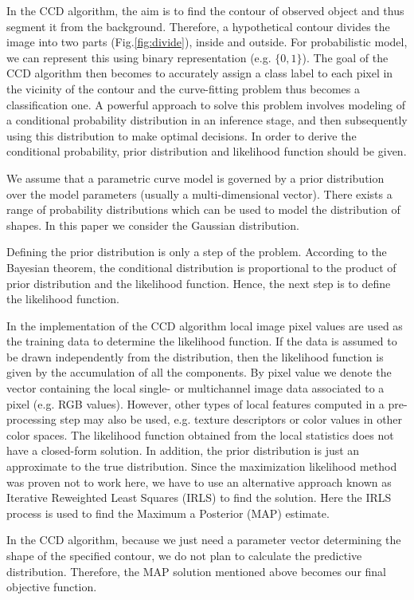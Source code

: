 \documentclass[conference]{IEEEtran}
\begin{document}
In the CCD algorithm, the aim is to find the contour of observed object
and thus segment it from the background. Therefore, a hypothetical 
contour divides the image into two parts (Fig.\ref{fig:divide}), inside
and outside. For probabilistic model, we can represent this using
binary representation (e.g. $\{0, 1\}$). The goal of the CCD algorithm
then becomes to accurately assign a class label to each pixel in the vicinity of the
contour and the curve-fitting problem thus becomes a classification
one. A powerful approach to solve this problem involves modeling of a
conditional probability distribution in an inference stage, and then
subsequently using this distribution to make optimal decisions. In
order to derive the conditional probability, prior distribution and
likelihood function should be given.

We assume that a parametric curve model is governed by a prior distribution
over the model parameters (usually a multi-dimensional vector). There
exists a range of probability distributions which can be used to model
the distribution of shapes. In this paper we consider the Gaussian distribution.

Defining the prior distribution is only a step of the problem.
According to the Bayesian theorem, the conditional distribution
is proportional to the product of prior distribution and the likelihood
function. Hence, the next step is to define the likelihood function.

In the implementation of the CCD algorithm local image pixel values are used
as the training data to determine the likelihood function. If the data is 
assumed to be drawn independently from the distribution, then the likelihood 
function is given by the accumulation of all the components.
By pixel value we denote the vector containing the local single- or multichannel
image data associated to a pixel (e.g. RGB values). 
However, other types of local features computed in a pre-processing
step may also be used, e.g. texture descriptors or color values in
other color spaces. The likelihood function obtained from the local statistics does
not have a closed-form solution. In addition, the prior distribution is just
an approximate to the true distribution. Since the maximization
likelihood method was proven \cite{bishop2006pattern} not to work here, we have to use an alternative
approach known as Iterative Reweighted Least Squares (IRLS) to find
the solution. Here the IRLS process is used to find the Maximum a Posterior (MAP)
estimate.

In the CCD algorithm, because we just need a parameter vector determining
the shape of the specified contour, we do not plan to calculate the
predictive distribution. Therefore, the MAP solution mentioned above
becomes our final objective function.
\end{document}
